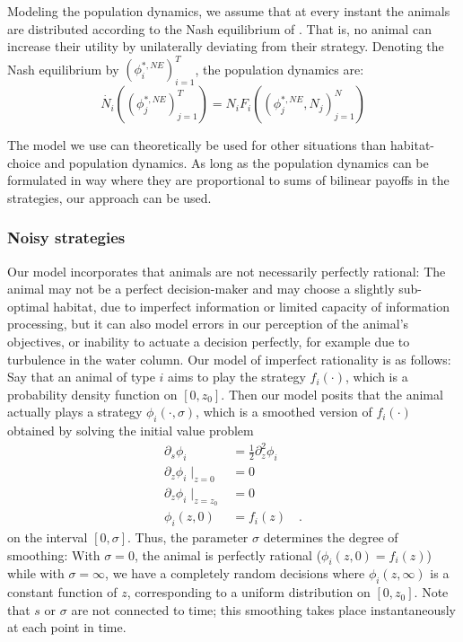 Modeling the population dynamics, we assume that at every instant the animals are distributed according to the Nash equilibrium of . That is, no animal can increase their utility by unilaterally deviating from their strategy. Denoting the Nash equilibrium by $(\phi_i^{*,NE})^T_{i=1}$, the population dynamics are:
\begin{equation}
  \dot{N_i}((\phi_j^{*,NE})_{j=1}^T ) = N_i F_i((\phi_j^{*,NE},N_j)_{j=1}^N)
\end{equation}

The model we use can theoretically be used for other situations than habitat-choice and population dynamics. As long as the population dynamics can be formulated in way where they are proportional to sums of bilinear payoffs in the strategies, our approach can be used.



\subsubsection{Noisy strategies}
Our model incorporates that animals are not necessarily perfectly rational: The animal may not be a perfect decision-maker and may choose a slightly sub-optimal habitat, due to imperfect information or limited capacity of information processing, but it can also model errors in our perception of the animal's objectives, or inability to actuate a decision perfectly, for example due to turbulence in the water column. Our model of imperfect rationality is as follows: Say that an animal of type $i$ aims to play the strategy $f_i(\cdot)$, which is a probability density function on $[0,z_0]$. Then our model posits that the animal actually plays a strategy $\phi_i(\cdot ,\sigma)$, which is a smoothed version of $f_i(\cdot)$ obtained by solving the initial value problem
\begin{equation}
  \begin{split}
  \label{eq:density_PDE}
  \partial_s \phi_i &= \frac{1}{2}\partial_z^2 \phi_i \\
  \partial_z \phi_i \mid_{z=0} &= 0 \\
  \partial_z \phi_i \mid_{z = z_0} &= 0 \\
   \phi_i(z,0) &= f_i(z) \quad .
 \end{split}
\end{equation}
on the interval $[0,\sigma]$. Thus, the parameter $\sigma$ determines the degree of smoothing: With $\sigma=0$, the animal is perfectly rational ($\phi_i(z,0)=f_i(z)$) while with $\sigma=\infty$, we have a completely random decisions where $\phi_i(z,\infty)$ is a constant function of $z$, corresponding to a uniform distribution on $[0,z_0]$. Note that $s$ or $\sigma$ are not connected to time; this smoothing takes place instantaneously at each point in time.

